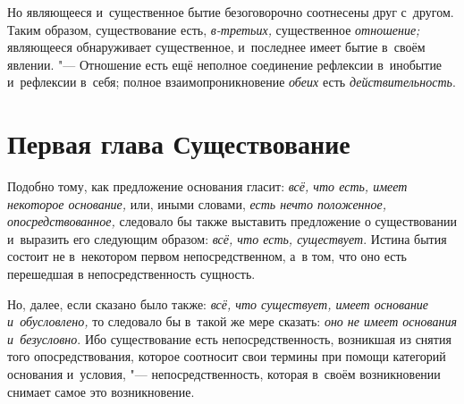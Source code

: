 Но являющееся и~существенное бытие безоговорочно соотнесены друг с~другом.
Таким образом, существование есть, {\em в-третьих,}
существенное {\em отношение;} являющееся обнаруживает
существенное, и~последнее имеет бытие в~своём явлении. "--- Отношение есть ещё
неполное соединение рефлексии в~инобытие и~рефлексии в~себя; полное
взаимопроникновение {\em обеих} есть {\em действительность}.

\chapter[{\em Первая глава} Существование]{Первая глава Существование}

Подобно тому, как предложение основания гласит:
{\em всё, что есть, имеет некоторое основание,} или,
иными словами, {\em есть нечто положенное,
опосредствованное,} следовало бы также выставить предложение о
существовании и~выразить его следующим образом:
{\em всё, что есть, существует}. Истина бытия состоит
не в~некотором первом непосредственном, а~в том, что оно есть перешедшая в
непосредственность сущность.

Но, далее, если сказано было также: {\em всё, что
существует, имеет основание и~обусловлено,} то следовало бы в~такой же мере
сказать: {\em оно не имеет основания и~безусловно}. Ибо
существование есть непосредственность, возникшая из снятия того
опосредствования, которое соотносит свои термины при помощи категорий
основания и~условия, "--- непосредственность, которая в~своём возникновении
снимает самое это возникновение.

